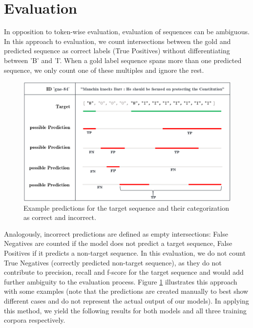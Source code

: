 \documentclass[12pt,pdftex,a4paper]{scrartcl}
\begin{document}
\section{Evaluation}
In opposition to token-wise evaluation, evaluation of sequences can be ambiguous. In this approach to evaluation, we count intersections between the gold and predicted sequence as correct labels (True Positives) without differentiating between 'B' and 'I'. When a gold label sequence spans more than one predicted sequence, we only count one of these multiples and ignore the rest. 

\begin{figure}[h!]
\centering \includegraphics[width =.8\textwidth]{eval}
\caption{Example predictions for the target sequence and their categorization as correct and incorrect.}\label{fig:eval}
\end{figure}

Analogously, incorrect predictions are defined as empty intersections: False Negatives are counted if the model does not predict a target sequence, False Positives if it predicts a non-target sequence. In this evaluation, we do not count True Negatives (correctly predicted non-target sequence), as they do not contribute to precision, recall and f-score for the target sequence and would add further ambiguity to the evaluation process. Figure \ref{fig:eval} illustrates this approach with some examples (note that the predictions are created manually to best show different cases and do not represent the actual output of our models). In applying this method, we yield the following results for both models and all three training corpora respectively.
\end{document}
